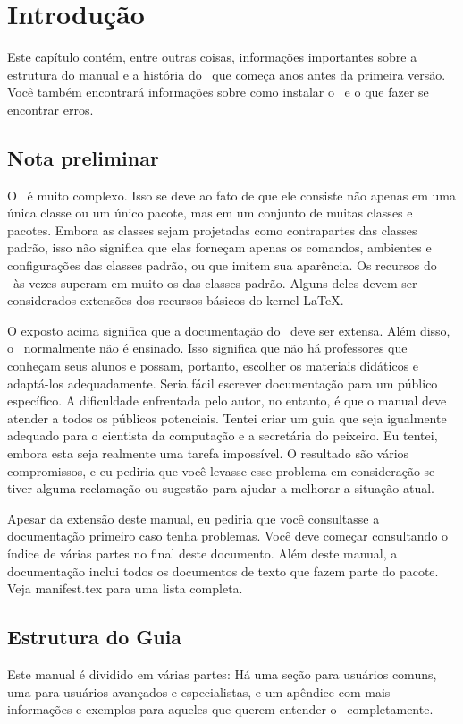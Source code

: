 \chapter{Introdução}
Este capítulo contém, entre outras coisas, informações importantes sobre a estrutura do manual e a história do \KOMAScript\, que começa anos antes da primeira versão. Você também encontrará informações sobre como instalar o \KOMAScript\ e o que fazer se encontrar erros.

\section{Nota preliminar}
O \KOMAScript\ é muito complexo. Isso se deve ao fato de que ele consiste não apenas em uma única classe ou um único pacote, mas em um conjunto de muitas classes e pacotes. Embora as classes sejam projetadas como contrapartes das classes padrão, isso não significa que elas forneçam apenas os comandos, ambientes e configurações das classes padrão, ou que imitem sua aparência. Os recursos do \KOMAScript\ às vezes superam em muito os das classes padrão. Alguns deles devem ser considerados extensões dos recursos básicos do kernel \LaTeX.

O exposto acima significa que a documentação do \KOMAScript\ deve ser extensa. Além disso, o \KOMAScript\ normalmente não é ensinado. Isso significa que não há professores que conheçam seus alunos e possam, portanto, escolher os materiais didáticos e adaptá-los adequadamente. Seria fácil escrever documentação para um público específico. A dificuldade enfrentada pelo autor, no entanto, é que o manual deve atender a todos os públicos potenciais. Tentei criar um guia que seja igualmente adequado para o cientista da computação e a secretária do peixeiro. Eu tentei, embora esta seja realmente uma tarefa impossível. O resultado são vários compromissos, e eu pediria que você levasse esse problema em consideração se tiver alguma reclamação ou sugestão para ajudar a melhorar a situação atual.

Apesar da extensão deste manual, eu pediria que você consultasse a documentação primeiro caso tenha problemas. Você deve começar consultando o índice de várias partes no final deste documento. Além deste manual, a documentação inclui todos os documentos de texto que fazem parte do pacote. Veja manifest.tex para uma lista completa.
\section{Estrutura do Guia}
Este manual é dividido em várias partes: Há uma seção para usuários comuns, uma para usuários avançados e especialistas, e um apêndice com mais informações e exemplos para aqueles que querem entender o \KOMAScript\ completamente.

